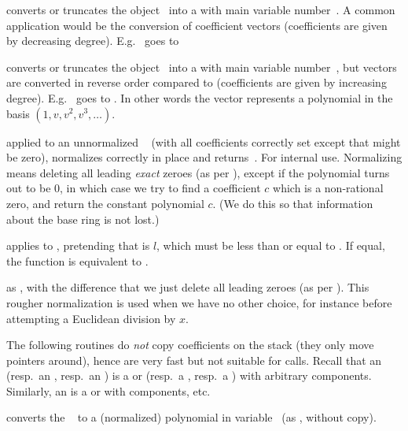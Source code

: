 
 converts or truncates the object~
into a  with main variable number~. A common application
would be the conversion of coefficient vectors (coefficients are given by
decreasing degree). E.g.~\kbd{[2,3]} goes to 

 converts or truncates the object~
into a  with main variable number~, but vectors are converted
in reverse order compared to  (coefficients are given by
increasing degree). E.g.~\kbd{[2,3]} goes to . In other words
the vector represents a polynomial in the basis $(1,v,v^2,v^3,\dots)$.

 applied to an unnormalized ~
(with all coefficients correctly set except that  might
be zero), normalizes  correctly in place and returns~. For
internal use. Normalizing means deleting all leading \emph{exact} zeroes
(as per ), except if the polynomial turns out to be $0$,
in which case we try to find a coefficient $c$ which is a non-rational zero,
and return the constant polynomial $c$. (We do this so that information
about the base ring is not lost.)

 applies  to
, pretending that  is $l$, which must be less than
or equal to . If equal, the function is equivalent to
.

 as ,
with the difference that we just delete all leading zeroes (as per
). This rougher normalization is used when we have no other
choice, for instance before attempting a Euclidean division by $x$.

The following routines do \emph{not} copy coefficients on the stack (they
only move pointers around), hence are very fast but not suitable for
 calls. Recall that an  (resp.~an , resp.~an
) is a  or  (resp.~a , resp.~a )
with arbitrary components. Similarly, an  is a  or
 with  components, etc.

 converts the ~ to a
(normalized) polynomial in variable~ (as , without
copy).

